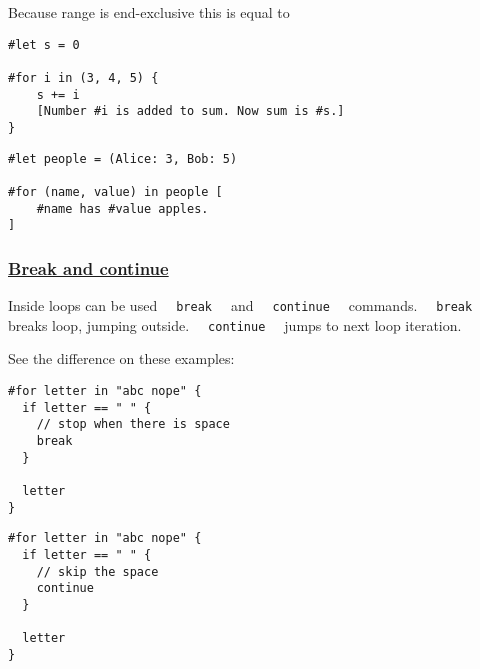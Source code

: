 Because range is end-exclusive this is equal to

\begin{verbatim}
#let s = 0

#for i in (3, 4, 5) {
    s += i
    [Number #i is added to sum. Now sum is #s.]
}
\end{verbatim}

\pandocbounded{}

\begin{verbatim}
#let people = (Alice: 3, Bob: 5)

#for (name, value) in people [
    #name has #value apples.
]
\end{verbatim}

\pandocbounded{}

\subsubsection{\texorpdfstring{\hyperref[break-and-continue]{Break and
continue}}{Break and continue}}\label{break-and-continue}

Inside loops can be used \texttt{\ }{\texttt{\ break\ }}\texttt{\ } and
\texttt{\ }{\texttt{\ continue\ }}\texttt{\ } commands.
\texttt{\ }{\texttt{\ break\ }}\texttt{\ } breaks loop, jumping outside.
\texttt{\ }{\texttt{\ continue\ }}\texttt{\ } jumps to next loop
iteration.

See the difference on these examples:

\begin{verbatim}
#for letter in "abc nope" {
  if letter == " " {
    // stop when there is space
    break
  }

  letter
}
\end{verbatim}

\pandocbounded{}

\begin{verbatim}
#for letter in "abc nope" {
  if letter == " " {
    // skip the space
    continue
  }

  letter
}
\end{verbatim}

\pandocbounded{}


